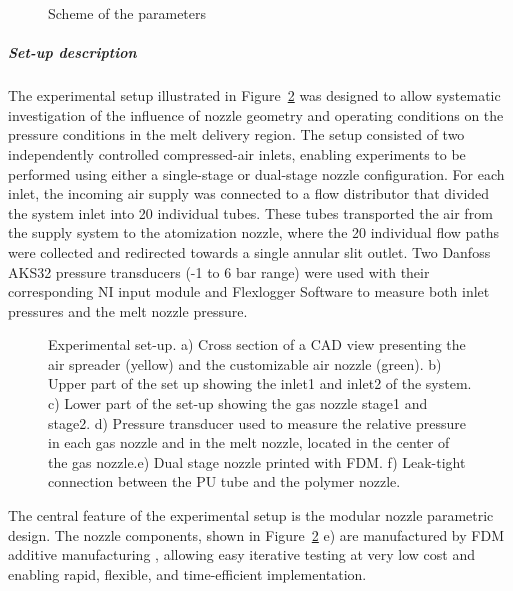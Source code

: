 \documentclass[../../../main.tex]{subfiles}
\begin{document}
\vspace{0mm}
\begin{figure}[H]
    \centering
        
        \caption{Scheme of the parameters}
        \label{f:parameters_scheme}
\end{figure}
\FloatBarrier
\vspace{0mm}

\subparagraph{Set-up description}

The experimental setup illustrated in Figure~\ref{f:set-up} was designed to allow systematic investigation of the influence of nozzle geometry and operating conditions on the pressure conditions in the melt delivery region. The setup consisted of two independently controlled compressed-air inlets, enabling experiments to be performed using either a single-stage or dual-stage nozzle configuration. For each inlet, the incoming air supply was connected to a flow distributor that divided the system inlet into 20 individual tubes. These tubes transported the air from the supply system to the atomization nozzle, where the 20 individual flow paths were collected and redirected towards a single annular slit outlet. Two Danfoss AKS32 pressure transducers (-1 to 6 bar range) were used with their corresponding NI input module and Flexlogger Software to measure both inlet pressures and the melt nozzle pressure.

\begin{figure}[H]
    \centering
        
        \caption[Experimental set-up]{Experimental set-up. a) Cross section of a CAD view presenting the air spreader (yellow) and the customizable air nozzle (green). b) Upper part of the set up showing the inlet1 and inlet2 of the system. c) Lower part of the set-up showing the gas nozzle stage1 and stage2. d) Pressure transducer used to measure the relative pressure in each gas nozzle and in the melt nozzle, located in the center of the gas nozzle.e) Dual stage nozzle printed with FDM. f) Leak-tight connection between the PU tube and the polymer nozzle.}
        \label{f:set-up}
\end{figure}

The central feature of the experimental setup is the modular nozzle parametric design. The nozzle components, shown in Figure~\ref{f:set-up} e) are manufactured by FDM additive manufacturing \cite{Cano-Vicent2021FusedDeposition}, allowing easy iterative testing at very low cost and enabling rapid, flexible, and time-efficient implementation.
\end{document}
